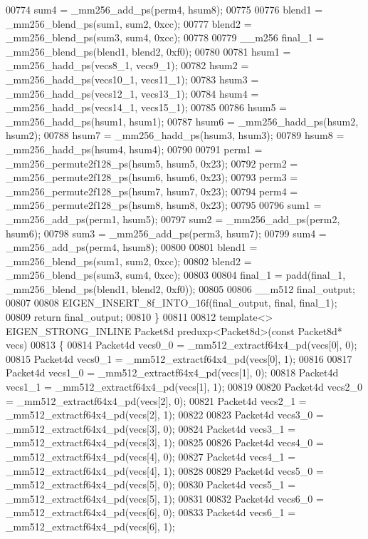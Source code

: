 \begin{DoxyCode}
00774   sum4 = \_mm256\_add\_ps(perm4, hsum8);
00775 
00776   blend1 = \_mm256\_blend\_ps(sum1, sum2, 0xcc);
00777   blend2 = \_mm256\_blend\_ps(sum3, sum4, 0xcc);
00778 
00779   \_\_m256 final\_1 = \_mm256\_blend\_ps(blend1, blend2, 0xf0);
00780 
00781   hsum1 = \_mm256\_hadd\_ps(vecs8\_1, vecs9\_1);
00782   hsum2 = \_mm256\_hadd\_ps(vecs10\_1, vecs11\_1);
00783   hsum3 = \_mm256\_hadd\_ps(vecs12\_1, vecs13\_1);
00784   hsum4 = \_mm256\_hadd\_ps(vecs14\_1, vecs15\_1);
00785 
00786   hsum5 = \_mm256\_hadd\_ps(hsum1, hsum1);
00787   hsum6 = \_mm256\_hadd\_ps(hsum2, hsum2);
00788   hsum7 = \_mm256\_hadd\_ps(hsum3, hsum3);
00789   hsum8 = \_mm256\_hadd\_ps(hsum4, hsum4);
00790 
00791   perm1 = \_mm256\_permute2f128\_ps(hsum5, hsum5, 0x23);
00792   perm2 = \_mm256\_permute2f128\_ps(hsum6, hsum6, 0x23);
00793   perm3 = \_mm256\_permute2f128\_ps(hsum7, hsum7, 0x23);
00794   perm4 = \_mm256\_permute2f128\_ps(hsum8, hsum8, 0x23);
00795 
00796   sum1 = \_mm256\_add\_ps(perm1, hsum5);
00797   sum2 = \_mm256\_add\_ps(perm2, hsum6);
00798   sum3 = \_mm256\_add\_ps(perm3, hsum7);
00799   sum4 = \_mm256\_add\_ps(perm4, hsum8);
00800 
00801   blend1 = \_mm256\_blend\_ps(sum1, sum2, 0xcc);
00802   blend2 = \_mm256\_blend\_ps(sum3, sum4, 0xcc);
00803 
00804   final\_1 = padd(final\_1, \_mm256\_blend\_ps(blend1, blend2, 0xf0));
00805 
00806   \_\_m512 final\_output;
00807 
00808   EIGEN\_INSERT\_8f\_INTO\_16f(final\_output, \textcolor{keyword}{final}, final\_1);
00809   \textcolor{keywordflow}{return} final\_output;
00810 \}
00811 
00812 \textcolor{keyword}{template}<> EIGEN\_STRONG\_INLINE Packet8d preduxp<Packet8d>(\textcolor{keyword}{const} Packet8d* vecs)
00813 \{
00814   Packet4d vecs0\_0 = \_mm512\_extractf64x4\_pd(vecs[0], 0);
00815   Packet4d vecs0\_1 = \_mm512\_extractf64x4\_pd(vecs[0], 1);
00816 
00817   Packet4d vecs1\_0 = \_mm512\_extractf64x4\_pd(vecs[1], 0);
00818   Packet4d vecs1\_1 = \_mm512\_extractf64x4\_pd(vecs[1], 1);
00819 
00820   Packet4d vecs2\_0 = \_mm512\_extractf64x4\_pd(vecs[2], 0);
00821   Packet4d vecs2\_1 = \_mm512\_extractf64x4\_pd(vecs[2], 1);
00822 
00823   Packet4d vecs3\_0 = \_mm512\_extractf64x4\_pd(vecs[3], 0);
00824   Packet4d vecs3\_1 = \_mm512\_extractf64x4\_pd(vecs[3], 1);
00825 
00826   Packet4d vecs4\_0 = \_mm512\_extractf64x4\_pd(vecs[4], 0);
00827   Packet4d vecs4\_1 = \_mm512\_extractf64x4\_pd(vecs[4], 1);
00828 
00829   Packet4d vecs5\_0 = \_mm512\_extractf64x4\_pd(vecs[5], 0);
00830   Packet4d vecs5\_1 = \_mm512\_extractf64x4\_pd(vecs[5], 1);
00831 
00832   Packet4d vecs6\_0 = \_mm512\_extractf64x4\_pd(vecs[6], 0);
00833   Packet4d vecs6\_1 = \_mm512\_extractf64x4\_pd(vecs[6], 1);

\end{DoxyCode}
